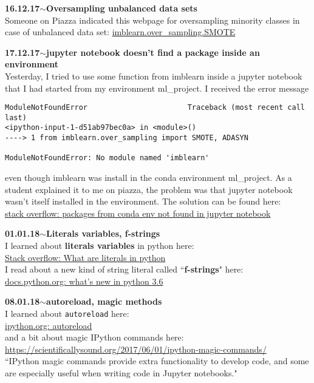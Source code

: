 \documentclass[11pt,a4paper]{article}
\newenvironment{loggentry}[2]%
{\noindent\textbf{#1}\hspace{1cm}$\mathbf{\sim}$\text{ }\textbf{#2}\\}{\vspace{0.5cm}}
\begin{document}
\begin{loggentry}{16.12.17}{Oversampling unbalanced data sets}
Someone on Piazza indicated this webpage for oversampling minority classes in case of unbalanced data set:
\href{http://contrib.scikit-learn.org/imbalanced-learn/stable/generated/imblearn.over_sampling.SMOTE.html}{imblearn.over\_sampling.SMOTE}
\end{loggentry}

\begin{loggentry}{17.12.17}{jupyter notebook doesn't find a package inside an environment}
Yesterday, I tried to use some function from imblearn inside a jupyter notebook that I had started from my environment ml\_project. I received the error message 
\begin{verbatim}
ModuleNotFoundError                       Traceback (most recent call last)
<ipython-input-1-d51ab97bec0a> in <module>()
----> 1 from imblearn.over_sampling import SMOTE, ADASYN

ModuleNotFoundError: No module named 'imblearn'
\end{verbatim}
even though imblearn was install in the conda environment ml\_project. As a student explained it to me on piazza, the problem was that jupyter notebook wasn't itself installed in the environment. The solution can be found here:\\
\href{https://stackoverflow.com/questions/36382508/packages-from-conda-env-not-found-in-jupyer-notebook}{stack overflow: packages from conda env not found in jupyter notebook}\\
\end{loggentry}

\begin{loggentry}{01.01.18}{Literals variables, f-strings}
I learned about \textbf{literals variables} in python here:\\
\href{https://stackoverflow.com/questions/34189086/what-are-literals-in-python#34189196}{Stack overflow: What are literals in python}\\
I read about a new kind of string literal called ``\textbf{f-strings}" here:\\
\href{https://docs.python.org/3/whatsnew/3.6.html#whatsnew36-pep498}{docs.python.org: what's new in python 3.6}\\
\end{loggentry}

\begin{loggentry}{08.01.18}{autoreload, magic methods}
I learned about \texttt{autoreload} here:\\
\href{https://ipython.org/ipython-doc/3/config/extensions/autoreload.html}{ipython.org: autoreload}\\
and a bit about magic IPython commands here:\\
\url{https://scientificallysound.org/2017/06/01/ipython-magic-commands/}\\
``IPython magic commands provide extra functionality to develop code, and some are especially useful when writing code in Jupyter notebooks."
\end{loggentry}
\end{document}
